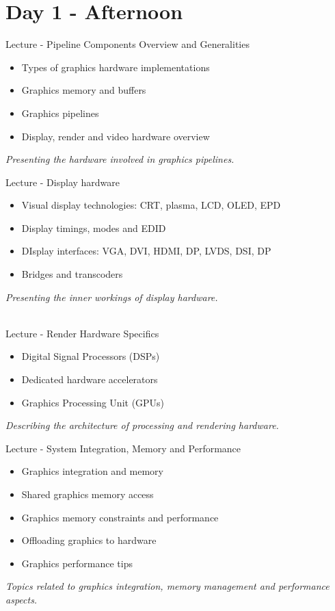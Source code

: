 \documentclass[a4paper,12pt,obeyspaces,spaces,hyphens]{article}
\begin{document}
\section{Day 1 - Afternoon}

\feagendatwocolumn
{Lecture - Pipeline Components Overview and Generalities}
{
  \begin{itemize}
  \item Types of graphics hardware implementations
  \item Graphics memory and buffers
  \item Graphics pipelines
  \item Display, render and video hardware overview
  \end{itemize}
  \vspace{0.5em}
  {\em Presenting the hardware involved in graphics pipelines.}
}
{Lecture - Display hardware}
{
  \begin{itemize}
  \item Visual display technologies: CRT, plasma, LCD, OLED, EPD
  \item Display timings, modes and EDID
  \item DIsplay interfaces: VGA, DVI, HDMI, DP, LVDS, DSI, DP
  \item Bridges and transcoders
  \end{itemize}
  \vspace{0.5em}
  {\em Presenting the inner workings of display hardware.}
}
\\

\feagendatwocolumn
{Lecture - Render Hardware Specifics}
{
  \begin{itemize}
  \item Digital Signal Processors (DSPs)
  \item Dedicated hardware accelerators
  \item Graphics Processing Unit (GPUs)
  \end{itemize}
  \vspace{0.5em}
  {\em Describing the architecture of processing and rendering hardware.}
}
{Lecture - System Integration, Memory and Performance}
{
  \begin{itemize}
  \item Graphics integration and memory
  \item Shared graphics memory access
  \item Graphics memory constraints and performance
  \item Offloading graphics to hardware
  \item Graphics performance tips
  \end{itemize}
  \vspace{0.5em}
  {\em Topics related to graphics integration, memory management and performance aspects.}
}
\end{document}
